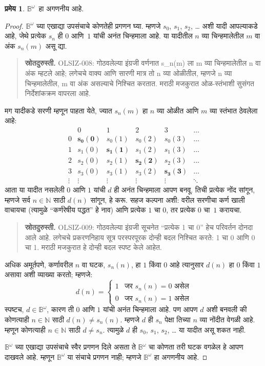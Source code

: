 \documentclass[11pt,a4paper,openany]{book}
\theoremstyle{definition}
\newtheorem{thm}[defn]{प्रमेय}
\newcommand{\Nat}{\mathbb{N}}
\newcommand{\Bin}{\mathbb{B}}
\begin{document}
\begin{thm}
\label{sfr:siz:nen-alt:thm:nonenum-bin-omega}
$\Bin^\omega$~हा अगणनीय आहे.
\end{thm}

\begin{proof}
$\Bin^\omega$ च्या एखाद्या उपसंचाचे कोणतेही प्रगणन घ्या. म्हणजे
$s_{0}$, $s_{1}$, $s_{2}$, \dots{} अशी यादी आपल्याकडे आहे, जेथे
प्रत्येक $s_n$ ही $0$ आणि~$1$ यांची अनंत चिन्हमाला आहे. या यादीतील
$n$ व्या चिन्हमालेतील $m$ वा अंक $s_n(m)$ असू द्या.
\begin{quote}\small\textbf{स्रोतदुरुस्ती.} OLSIZ-008: गोठवलेल्या इंग्रजी वर्णनात s\_n(m) ला m व्या चिन्हमालेतील n वा अंक म्हटले आहे; लगेचचे वाक्य आणि सारणी मात्र तो n व्या ओळीतील, म्हणजे n व्या चिन्हमालेतील, m वा अंक असल्याचे निश्चित करतात. मराठी मजकुरात ओळ-स्तंभाशी सुसंगत निर्देशांकक्रम वापरला आहे.\end{quote}
मग यादीकडे सरणी म्हणून पाहता येते, ज्यात $s_n(m)$ हा $n$ व्या ओळीत
आणि $m$ व्या स्तंभात ठेवलेला आहे:
\[
\begin{array}{c|c|c|c|c|c}
& 0 & 1 & 2 & 3 & \dots \\\hline
0 & \mathbf{s_{0}(0)} & s_{0}(1) & s_{0}(2) & s_0(3) & \dots \\\hline
1 & s_{1}(0)& \mathbf{s_{1}(1)} & s_1(2) & s_1(3) & \dots \\\hline
2 & s_{2}(0)& s_{2}(1) & \mathbf{s_2(2)} & s_2(3) & \dots \\\hline
3 & s_{3}(0)& s_{3}(1) & s_3(2) & \mathbf{s_3(3)} & \dots \\\hline
\vdots & \vdots & \vdots & \vdots & \vdots & \mathbf{\ddots}
\end{array}
\]
आता या यादीत नसलेली $0$ आणि $1$ यांची $d$ ही अनंत चिन्हमाला आपण
बनवू. तिची प्रत्येक नोंद सांगून, म्हणजे सर्व $n \in \Nat$ साठी
$d(n)$ सांगून, हे करू. सहज कल्पना अशी: वरील सरणीचा कर्ण खाली वाचायचा
(त्यामुळे ``कर्णरेषीय पद्धत'' हे नाव) आणि प्रत्येक $1$ चा $0$, तर
प्रत्येक $0$ चा~$1$ करायचा.
\begin{quote}\small\textbf{स्रोतदुरुस्ती.} OLSIZ-009: गोठवलेल्या इंग्रजी सूचनेत “प्रत्येक 1 चा 0” हेच परिवर्तन दोनदा आले आहे. लगेचचे प्रकरणनिहाय सूत्र परस्परपूरक दोन्ही बदल निश्चित करते: 1 चा 0 आणि 0 चा 1. मराठी मजकुरात हे दोन्ही बदल स्पष्ट केले आहेत.\end{quote}
अधिक अमूर्तपणे, कर्णावरील $n$ वा घटक, $s_n(n)$, हा $1$ किंवा
$0$ आहे त्यानुसार $d(n)$ हा $0$ किंवा $1$ असावा अशी व्याख्या करतो;
म्हणजे:
\[
d(n) =
\begin{cases}
1 & \text{जर $s_{n}(n) = 0$ असेल}\\
0 & \text{जर $s_{n}(n) = 1$ असेल}
\end{cases}
\]
स्पष्टच, $d \in \Bin^\omega$, कारण ती $0$ आणि $1$ यांची अनंत
चिन्हमाला आहे. पण आपण $d$ अशी बनवली की कोणत्याही $n \in \Nat$
साठी $d(n) \neq s_n(n)$. म्हणजे $d$ ही $s_n$ पेक्षा तिच्या $n$ व्या
नोंदीत वेगळी आहे. म्हणून कोणत्याही $n\in \Nat$ साठी $d \neq s_n$.
त्यामुळे $d$ ही $s_0$, $s_1$, $s_2$, \dots{} या यादीत असू शकत नाही.

$\Bin^\omega$ च्या एखाद्या उपसंचाचे स्वैर प्रगणन दिले असता ते
$\Bin^\omega$ चा कोणता तरी घटक वगळेल हे आपण दाखवले आहे.
म्हणून $\Bin^\omega$ या संचाचे प्रगणन नाही; म्हणजे $\Bin^\omega$ हा
अगणनीय आहे.
\end{proof}
\end{document}
